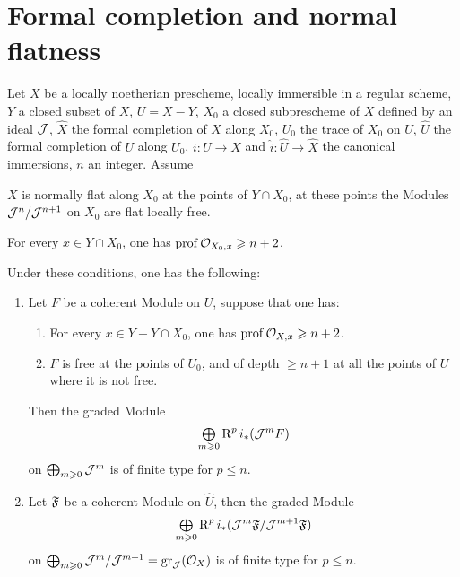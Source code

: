 \section{Formal completion and normal flatness} \label{XII.4}

\setcounter{equation}{18}

\begin{theorem} \label{XII.4.1} Let $X$ be a locally noetherian prescheme, locally immersible in a regular scheme, $Y$ a closed subset of $X$, $U=X- Y$, $X_0$ a closed subprescheme of $X$ defined by an ideal ${\mathcal J}$, $\widehat{X}$ the formal completion of $X$ along $X_0$, $U_0$ the trace of $X_0$ on $U$, $\widehat{U}$ the formal completion of $U$ along $U_0$, $i\colon U\to X$ and $\widehat{i}\colon \widehat{U}\to \widehat{X}$ the canonical immersions, $n$ an integer. Assume
\begin{enumeratea}
\item
$X$ is normally flat along $X_0$ at the points of $Y\cap X_0$, \ie at these points the Modules ${\mathcal J}^n/{\mathcal J}^{n+1}$ on $X_0$ are flat \ie locally free.
\item
For every $x\in Y\cap X_0$, one has $\operatorname{prof} {\mathcal O}_{X_0, x}\geqslant n+2$.
\end{enumeratea}
Under these conditions, one has the following:
\begin{enumerate}
\item Let $F$ be a coherent Module on $U$, suppose that one has:
\begin{enumerate}
\item[\textup{c)}] For every $x\in Y- Y\cap X_0$, one has $\operatorname{prof} {\mathcal O}_{X, x}\geqslant n+2$.

\item[\textup{d)}] $F$ is free at the points of $U_0$, and of depth $\geq n+1$ at all the points of $U$ where it is not free.
\end{enumerate}
Then the graded Module
\[
\mathop{\textstyle\bigoplus}\limits_{m\geqslant 0}\operatorname{R}^pi_\ast({\mathcal J}^mF)
\]
on $\bigoplus_{m\geqslant 0}{\mathcal J}^m$ is of finite type for $p\leq n$. \item Let $\mathfrak{F}$ be a coherent Module on $\widehat{U}$, then the graded Module
\[
\mathop{\textstyle\bigoplus}\limits_{m\geqslant 0}\operatorname{R}^pi_\ast({\mathcal J}^m\mathfrak{F}/{\mathcal J}^{m+1}\mathfrak{F})
\]
on $\bigoplus_{m\geqslant 0}{\mathcal J}^m/{\mathcal J}^{m+1}=\operatorname{gr}_{{\mathcal J}}(\mathcal{O}_X)$ is of finite type for $p\leq n$.
\end{enumerate}
\end{theorem}

